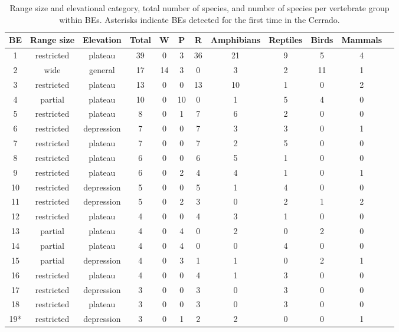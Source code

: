 \documentclass[12pt,openright,oneside,a4paper,english]{abntex2}
\begin{document}
\begin{table}
	\centering
	\caption[Biotic Elements (BEs categories and composition)]{\small Range size and elevational category, total number of species, and number of species per vertebrate group within BEs. Asterisks indicate BEs detected for the first time in the Cerrado.}
	\label{tab:tab2-1}
	\vspace{\bigskipamount}
	\footnotesize
	\begin{tabular}{c c c c c c c c c c c c}
		\hline
		\textbf{BE} & \textbf{Range size} & \textbf{Elevation} & \textbf{Total} & \textbf{W} & \textbf{P} & \textbf{R} & \textbf{Amphibians} & \textbf{Reptiles} & \textbf{Birds} & \textbf{Mammals}\\
		\hline
		1 & restricted & plateau & 39 & 0 & 3 & 36 & 21 & 9 & 5 & 4\\
		2 & wide & general & 17 & 14 & 3 & 0 & 3 & 2 & 11 & 1\\
		3 & restricted & plateau & 13 & 0 & 0 & 13 & 10 & 1 & 0 & 2\\
		4 & partial & plateau & 10 & 0 & 10 & 0 & 1 & 5 & 4 & 0\\
		5 & restricted & plateau & 8 & 0 & 1 & 7 & 6 & 2 & 0 & 0\\
		6 & restricted & depression & 7 & 0 & 0 & 7 & 3 & 3 & 0 & 1\\
		7 & restricted & plateau & 7 & 0 & 0 & 7 & 2 & 5 & 0 & 0\\
		8 & restricted & plateau & 6 & 0 & 0 & 6 & 5 & 1 & 0 & 0\\
		9 & restricted & plateau & 6 & 0 & 2 & 4 & 4 & 1 & 0 & 1\\
		10 & restricted & depression & 5 & 0 & 0 & 5 & 1 & 4 & 0 & 0\\
		11 & restricted & depression & 5 & 0 & 2 & 3 & 0 & 2 & 1 & 2\\
		12 & restricted & plateau & 4 & 0 & 0 & 4 & 3 & 1 & 0 & 0\\
		13 & partial & plateau & 4 & 0 & 4 & 0 & 2 & 0 & 2 & 0\\
		14 & partial & plateau & 4 & 0 & 4 & 0 & 0 & 4 & 0 & 0\\
		15 & partial & depression & 4 & 0 & 3 & 1 & 1 & 0 & 2 & 1\\
		16 & restricted & plateau & 4 & 0 & 0 & 4 & 1 & 3 & 0 & 0\\
		17 & restricted & depression & 3 & 0 & 0 & 3 & 0 & 3 & 0 & 0\\
		18 & restricted & plateau & 3 & 0 & 0 & 3 & 0 & 3 & 0 & 0\\
		19* & restricted & depression & 3 & 0 & 1 & 2 & 2 & 0 & 0 & 1\\

\end{tabular}
\end{table}
\end{document}
